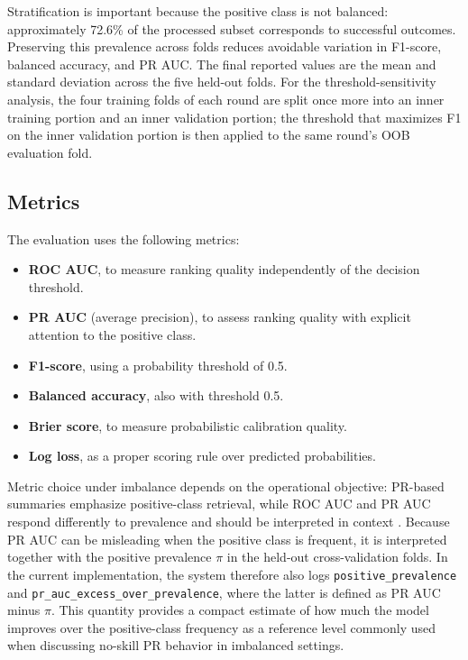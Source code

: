 \documentclass[conference]{IEEEtran}
\begin{document}
Stratification is important because the positive class is not balanced: approximately 72.6\% of the processed subset corresponds to successful outcomes. Preserving this prevalence across folds reduces avoidable variation in F1-score, balanced accuracy, and PR AUC. The final reported values are the mean and standard deviation across the five held-out folds. For the threshold-sensitivity analysis, the four training folds of each round are split once more into an inner training portion and an inner validation portion; the threshold that maximizes F1 on the inner validation portion is then applied to the same round's OOB evaluation fold.

\subsection{Metrics}
The evaluation uses the following metrics:

\begin{itemize}
  \item \textbf{ROC AUC}, to measure ranking quality independently of the decision threshold.
  \item \textbf{PR AUC} (average precision), to assess ranking quality with explicit attention to the positive class.
  \item \textbf{F1-score}, using a probability threshold of 0.5.
  \item \textbf{Balanced accuracy}, also with threshold 0.5.
  \item \textbf{Brier score}, to measure probabilistic calibration quality.
  \item \textbf{Log loss}, as a proper scoring rule over predicted probabilities.
\end{itemize}

Metric choice under imbalance depends on the operational objective: PR-based summaries emphasize positive-class retrieval, while ROC AUC and PR AUC respond differently to prevalence and should be interpreted in context \cite{richardson2024roc}. Because PR AUC can be misleading when the positive class is frequent, it is interpreted together with the positive prevalence $\pi$ in the held-out cross-validation folds. In the current implementation, the system therefore also logs \texttt{positive\_prevalence} and \texttt{pr\_auc\_excess\_over\_prevalence}, where the latter is defined as PR AUC minus $\pi$. This quantity provides a compact estimate of how much the model improves over the positive-class frequency as a reference level commonly used when discussing no-skill PR behavior in imbalanced settings.
\end{document}
